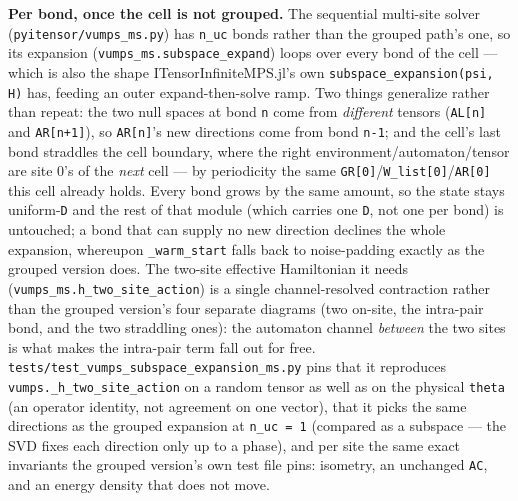 \documentclass[11pt]{article}
\begin{document}
\textbf{Per bond, once the cell is not grouped.} The sequential
multi-site solver (\texttt{pyitensor/vumps\_ms.py}) has \texttt{n\_uc}
bonds rather than the grouped path's one, so its expansion
(\texttt{vumps\_ms.subspace\_expand}) loops over every bond of the cell
--- which is also the shape ITensorInfiniteMPS.jl's own
\texttt{subspace\_expansion(psi, H)} has, feeding an outer
expand-then-solve ramp. Two things generalize rather than repeat: the two
null spaces at bond \texttt{n} come from \emph{different} tensors
(\texttt{AL[n]} and \texttt{AR[n+1]}), so \texttt{AR[n]}'s new
directions come from bond \texttt{n-1}; and the cell's last bond
straddles the cell boundary, where the right
environment/automaton/tensor are site 0's of the \emph{next} cell ---
by periodicity the same \texttt{GR[0]}/\texttt{W\_list[0]}/\texttt{AR[0]}
this cell already holds. Every bond grows by the same amount, so the state
stays uniform-\texttt{D} and the rest of that module (which carries one
\texttt{D}, not one per bond) is untouched; a bond that can supply no new
direction declines the whole expansion, whereupon \texttt{\_warm\_start}
falls back to noise-padding exactly as the grouped version does. The
two-site effective Hamiltonian it needs
(\texttt{vumps\_ms.h\_two\_site\_action}) is a single channel-resolved
contraction rather than the grouped version's four separate diagrams
(two on-site, the intra-pair bond, and the two straddling ones): the
automaton channel \emph{between} the two sites is what makes the
intra-pair term fall out for free.
\texttt{tests/test\_vumps\_subspace\_expansion\_ms.py} pins that it
reproduces \texttt{vumps.\_h\_two\_site\_action} on a random tensor as
well as on the physical \texttt{theta} (an operator identity, not
agreement on one vector), that it picks the same directions as the
grouped expansion at \texttt{n\_uc = 1} (compared as a subspace --- the
SVD fixes each direction only up to a phase), and per site the same exact
invariants the grouped version's own test file pins: isometry, an
unchanged \texttt{AC}, and an energy density that does not move.
\end{document}
